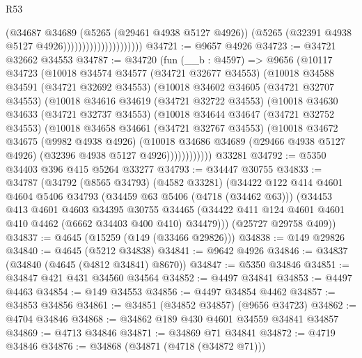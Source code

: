 \begin{lexlean}{R53}
\begin{coremodule}
                                        (@34687
                                          @34689
                                          (@5265 (@29461 @4938 @5127 @4926))
                                          (@5265 (@32391 @4938 @5127 @4926)))))))))))))))))))))
@34721 := @9657 @4926
@34723 := @34721 @32662 @34553
@34787 := @34720
    (fun (__b : @4597) =>
    @9656
      (@10117
        @34723
        (@10018
          @34574
          @34577
          (@34721 @32677 @34553)
          (@10018
            @34588
            @34591
            (@34721 @32692 @34553)
            (@10018
              @34602
              @34605
              (@34721 @32707 @34553)
              (@10018
                @34616
                @34619
                (@34721 @32722 @34553)
                (@10018
                  @34630
                  @34633
                  (@34721 @32737 @34553)
                  (@10018
                    @34644
                    @34647
                    (@34721 @32752 @34553)
                    (@10018
                      @34658
                      @34661
                      (@34721 @32767 @34553)
                      (@10018
                        @34672
                        @34675
                        (@9982 @4938 @4926)
                        (@10018
                          @34686
                          @34689
                          (@29466 @4938 @5127 @4926)
                          (@32396 @4938 @5127 @4926))))))))))))
    @33281
@34792 := @5350 @34403 @396 @415 @5264 @33277
@34793 := @34447 @30755
@34833 := @34787
    (@34792
      (@8565 @34793)
      (@4582 @33281)
      (@34422
        @122
        @414
        @4601
        @4604
        @5406
        @34793
        (@34459 @63 @5406 (@4718 (@34462 @63)))
        (@34453
          @413
          @4601
          @4603
          @34395
          @30755
          @34465
          (@34422 @411 @124 @4601 @4601 @410 @4462 (@6662 @34403 @400 @410) @34479)))
      (@25727 @29758 @409))
@34837 := @4645 (@15259 (@149 (@33466 @29826)))
@34838 := @149 @29826
@34840 := @4645 (@5212 @34838)
@34841 := @9642 @4926
@34846 := @34837 (@34840 (@4645 (@4812 @34841) @8670))
@34847 := @5350 @34846
@34851 := @34847 @421 @431 @34560 @34564
@34852 := @4497 @34841
@34853 := @4497 @4463
@34854 := @149 @34553
@34856 := @4497 @34854 @4462
@34857 := @34853 @34856
@34861 := @34851 (@34852 @34857) (@9656 @34723)
@34862 := @4704 @34846
@34868 := @34862 @189 @430 @4601 @34559 @34841 @34857
@34869 := @4713 @34846
@34871 := @34869 @71 @34841
@34872 := @4719 @34846
@34876 := @34868 (@34871 (@4718 (@34872 @71)))

\end{coremodule}
\end{lexlean}
